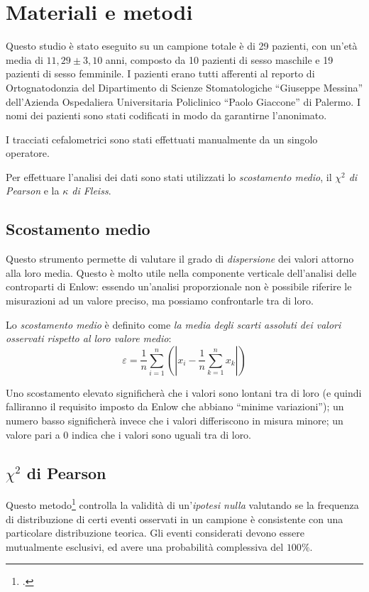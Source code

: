 \chapter{Materiali e metodi}
Questo studio è stato eseguito su un campione totale è di 29 pazienti, con un'età media di $11,29 \pm 3,10$ anni, composto da 10 pazienti di sesso maschile e 19 pazienti di sesso femminile. I pazienti erano tutti afferenti al reporto di Ortognatodonzia del Dipartimento di Scienze Stomatologiche ``Giuseppe Messina'' dell'Azienda Ospedaliera Universitaria Policlinico ``Paolo Giaccone'' di Palermo. I nomi dei pazienti sono stati codificati in modo da garantirne l'anonimato.

I tracciati cefalometrici sono stati effettuati manualmente da un singolo operatore. 

Per effettuare l'analisi dei dati sono stati utilizzati lo \emph{scostamento medio}, il \emph{$\chi^2$ di Pearson} e la \emph{$\kappa$ di Fleiss}.

\section{Scostamento medio}
\label{scostamento_medio}
Questo strumento permette di valutare il grado di \emph{dispersione} dei valori attorno alla loro media. Questo è molto utile nella componente verticale dell'analisi delle controparti di Enlow: essendo un'analisi proporzionale non è possibile riferire le misurazioni ad un valore preciso, ma possiamo confrontarle tra di loro.

Lo \emph{scostamento medio} è definito come \emph{la media degli scarti assoluti dei valori osservati rispetto al loro valore medio}:
\begin{equation}
\label{eq:scostamento_medio}
\varepsilon = \frac{1}{n}\sum_{i=1}^n{\left(\left|x_i - \frac{1}{n}\sum_{k=1}^n x_k\right|\right)}
\end{equation}

Uno scostamento elevato significherà che i valori sono lontani tra di loro (e quindi falliranno il requisito imposto da Enlow che abbiano ``minime variazioni''); un numero basso significherà invece che i valori differiscono in misura minore; un valore pari a 0 indica che i valori sono uguali tra di loro.

\section{$\chi^2$ di Pearson}
\label{sec:chi-square}
Questo metodo\footcite{Plackett1983} controlla la validità di un'\emph{ipotesi nulla} valutando se la frequenza di distribuzione di certi eventi osservati in un campione è consistente con una particolare distribuzione teorica. Gli eventi considerati devono essere mutualmente esclusivi, ed avere una probabilità complessiva del $100\%$.


